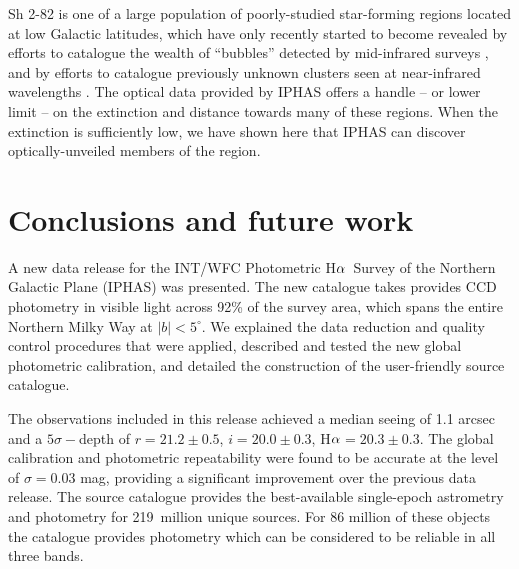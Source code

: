 \documentclass[useAMS,usenatbib]{mn2e}
\def\ha{\mbox{H$\rm \alpha$}}
\begin{document}

Sh 2-82 is one of a large population of poorly-studied star-forming regions
located at low Galactic latitudes,
which have only recently started to become revealed
by efforts to catalogue the wealth of ``bubbles'' detected
by mid-infrared surveys \cite[e.g.][]{Churchwell2006,Simpson2012},
and by efforts to catalogue previously unknown clusters seen 
at near-infrared wavelengths \cite[e.g.][]{Bica2003}.
The optical data provided by IPHAS offers a handle -- or lower limit --
on the extinction and distance towards many of these regions.
When the extinction is sufficiently low,
we have shown here that IPHAS can discover optically-unveiled 
members of the region.


\section{Conclusions and future work}
\label{sec:conclusions}

A new data release for the INT/WFC Photometric \ha\ Survey
of the Northern Galactic Plane (IPHAS) was presented.
The new catalogue takes provides CCD photometry in visible light
across 92\% of the survey area, which spans the entire Northern Milky Way 
at $|b|<5^\circ$.
We explained the data reduction and quality control procedures that
were applied, described and tested the new global photometric calibration,
and detailed the construction of the user-friendly source catalogue.

The observations included in this release
achieved a median seeing of 1.1 arcsec
and a $5\sigma-$depth of $r=21.2\pm 0.5$, $i=20.0\pm 0.3$, \ha$=20.3\pm 0.3$.
The global calibration and photometric repeatability
were found to be accurate at the level of $\sigma=0.03$ mag,
providing a significant improvement over the 
previous data release.
The source catalogue provides the best-available
single-epoch astrometry and photometry
for 219~million unique sources.
For 86 million of these objects the catalogue
provides photometry which can be considered to be reliable
in all three bands.
\end{document}
